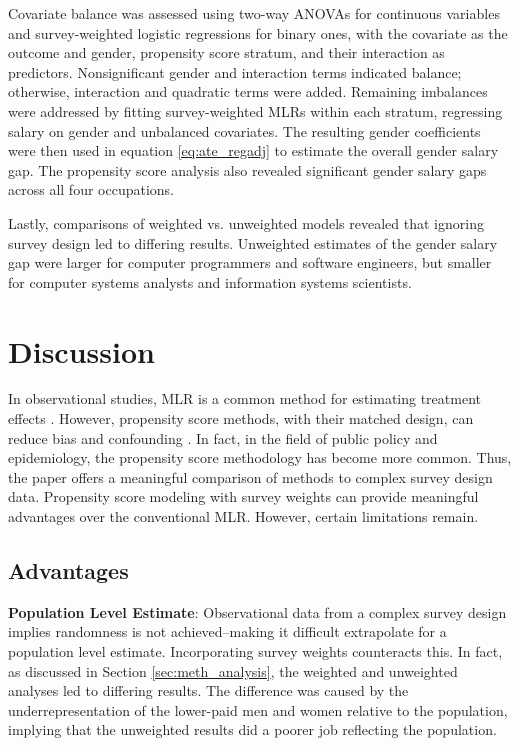 \documentclass[12pt]{article}
\begin{document}
Covariate balance was assessed using two-way ANOVAs for continuous variables and survey-weighted logistic regressions for binary ones, with the covariate as the outcome and gender, propensity score stratum, and their interaction as predictors. Nonsignificant gender and interaction terms indicated balance; otherwise, interaction and quadratic terms were added. Remaining imbalances were addressed by fitting survey-weighted MLRs within each stratum, regressing salary on gender and unbalanced covariates. The resulting gender coefficients were then used in equation \eqref{eq:ate_regadj} to estimate the overall gender salary gap. The propensity score analysis also revealed significant gender salary gaps across all four occupations.

Lastly, comparisons of weighted vs. unweighted models revealed that ignoring survey design led to differing results. Unweighted estimates of the gender salary gap were larger for computer programmers and software engineers, but smaller for computer systems analysts and information systems scientists.

\section{Discussion} \label{sec:discussion}

In observational studies, MLR is a common method for estimating treatment effects \cite{doi:https://doi.org/10.1002/0470090456.ch5}. However, propensity score methods, with their matched design, can reduce bias and confounding \cite{rosenbaum19834}. In fact, in the field of public policy and epidemiology, the propensity score methodology has become more common. Thus, the paper offers a meaningful comparison of methods to complex survey design data. Propensity score modeling with survey weights can provide meaningful advantages over the conventional MLR. However, certain limitations remain.

\subsection{Advantages} \label{subsec:advantages}


\textbf{Population Level Estimate}: Observational data from a complex survey design implies randomness is not achieved--making it difficult extrapolate for a population level estimate. Incorporating survey weights counteracts this. In fact, as discussed in Section \ref{sec:meth_analysis}, the weighted and unweighted analyses led to differing results. The difference was caused by the underrepresentation of the lower-paid men and women relative to the population, implying that the unweighted results did a poorer job reflecting the population.
\end{document}
